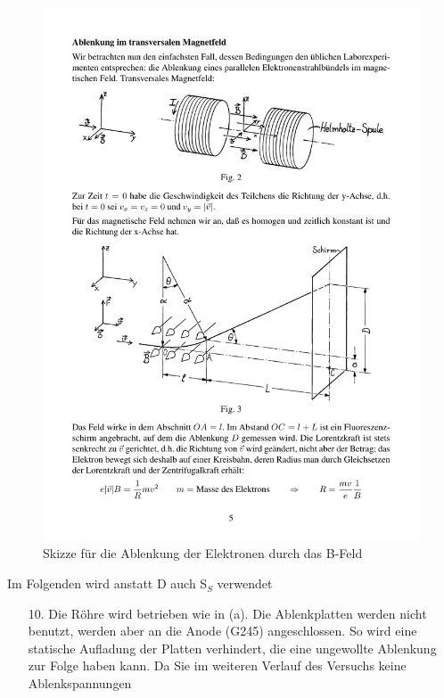 \documentclass[12pt]{scrartcl}
\begin{document}
\begin{itemize}
\begin{figure}[htbp] 
  \centering
    \includegraphics[trim = 1mm 55mm 1mm 91mm, clip, scale = 1]{B_ablenkung.pdf}
  	\caption[Skizze für die Ablenkung der Elektronen durch das B-Feld]{Skizze für die Ablenkung der Elektronen durch das B-Feld\footnotemark}
  \label{fig:E_ablenkung}
\end{figure}
Im Folgenden wird anstatt D auch S$_S$ verwendet	
\begin{enumerate}
\item[10.]
Die Röhre wird betrieben wie in (a). Die Ablenkplatten werden nicht benutzt, werden aber an die Anode (G245) angeschlossen. So wird eine statische Aufladung der Platten verhindert, die eine ungewollte Ablenkung zur Folge haben kann. Da Sie im weiteren Verlauf des Versuchs keine Ablenkspannungen

\end{enumerate}
\end{itemize}
\end{document}
